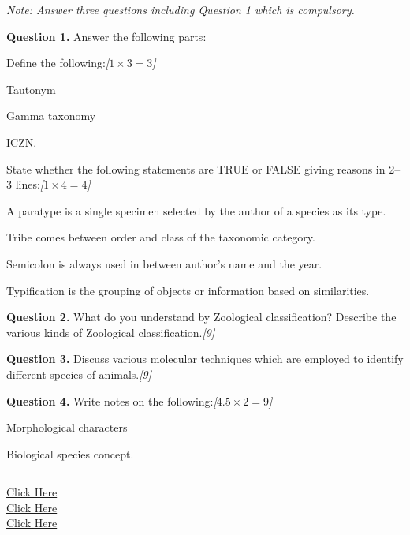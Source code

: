 \documentclass[11pt,a4paper]{article}
\newcommand{\pts}[1]{\hfill   \textit{[#1]}}
\begin{document}
\smallskip



\noindent   \textit{Note: Answer three questions including Question 1 which is compulsory.}

\bigskip



\noindent   \textbf{Question 1.} Answer the following parts:

\begin{parts}
  \item Define the following:\pts{$1  \times 3 = 3$}
  
\begin{parts}
    \item Tautonym
    \item Gamma taxonomy
    \item ICZN.
  \end{parts}

  \item State whether the following statements are TRUE or FALSE giving reasons in 2--3 lines:\pts{$1  \times 4 = 4$}
  
\begin{parts}
    \item A paratype is a single specimen selected by the author of a species as its type.
    \item Tribe comes between order and class of the taxonomic category.
    \item Semicolon is always used in between author's name and the year.
    \item Typification is the grouping of objects or information based on similarities.
  \end{parts}
\end{parts}

\medskip


\noindent   \textbf{Question 2.} What do you understand by Zoological classification? Describe the various kinds of Zoological classification.\pts{9}

\medskip


\noindent   \textbf{Question 3.} Discuss various molecular techniques which are employed to identify different species of animals.\pts{9}

\medskip


\noindent   \textbf{Question 4.} Write notes on the following:\pts{$4.5  \times 2 = 9$}

\begin{parts}
  \item Morphological characters
  \item Biological species concept.
\end{parts}

\vfill
\rule{\linewidth}{0.4pt}

\begin{center}\small
\href{https://bhu-exam.vercel.app/}{Click Here}\\[4pt]\href{https://me-aryan.vercel.app/}{Click Here}\\[4pt]\href{https://quashan-me.vercel.app/}{Click Here}
\end{center}
\end{document}
